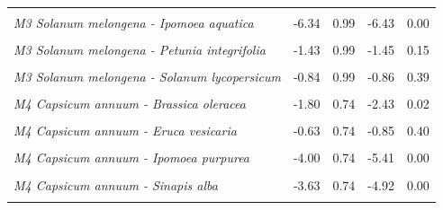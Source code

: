 \documentclass[12pt,]{article}
\begin{document}
\begin{longtable}[t]{>{}lrrrr}
\addlinespace
\em{\cellcolor{gray!6}{M3 Solanum melongena - Eruca vesicaria}} & \cellcolor{gray!6}{-3.12} & \cellcolor{gray!6}{0.99} & \cellcolor{gray!6}{-3.16} & \cellcolor{gray!6}{0.00}\\
\addlinespace
\em{M3 Solanum melongena - Ipomoea aquatica} & -6.34 & 0.99 & -6.43 & 0.00\\
\addlinespace
\em{\cellcolor{gray!6}{M3 Solanum melongena - Ipomoea purpurea}} & \cellcolor{gray!6}{-2.71} & \cellcolor{gray!6}{0.99} & \cellcolor{gray!6}{-2.74} & \cellcolor{gray!6}{0.01}\\
\addlinespace
\em{M3 Solanum melongena - Petunia integrifolia} & -1.43 & 0.99 & -1.45 & 0.15\\
\addlinespace
\em{\cellcolor{gray!6}{M3 Solanum melongena - Sinapis alba}} & \cellcolor{gray!6}{-1.11} & \cellcolor{gray!6}{0.99} & \cellcolor{gray!6}{-1.12} & \cellcolor{gray!6}{0.26}\\
\addlinespace
\em{M3 Solanum melongena - Solanum lycopersicum} & -0.84 & 0.99 & -0.86 & 0.39\\
\addlinespace
\em{\cellcolor{gray!6}{M4 Capsicum annuum - (Intercept)}} & \cellcolor{gray!6}{4.59} & \cellcolor{gray!6}{0.52} & \cellcolor{gray!6}{8.78} & \cellcolor{gray!6}{0.00}\\
\addlinespace
\em{M4 Capsicum annuum - Brassica oleracea} & -1.80 & 0.74 & -2.43 & 0.02\\
\addlinespace
\em{\cellcolor{gray!6}{M4 Capsicum annuum - Brassica rapa}} & \cellcolor{gray!6}{-2.51} & \cellcolor{gray!6}{0.74} & \cellcolor{gray!6}{-3.39} & \cellcolor{gray!6}{0.00}\\
\addlinespace
\em{M4 Capsicum annuum - Eruca vesicaria} & -0.63 & 0.74 & -0.85 & 0.40\\
\addlinespace
\em{\cellcolor{gray!6}{M4 Capsicum annuum - Ipomoea aquatica}} & \cellcolor{gray!6}{-1.36} & \cellcolor{gray!6}{0.74} & \cellcolor{gray!6}{-1.84} & \cellcolor{gray!6}{0.07}\\
\addlinespace
\em{M4 Capsicum annuum - Ipomoea purpurea} & -4.00 & 0.74 & -5.41 & 0.00\\
\addlinespace
\em{\cellcolor{gray!6}{M4 Capsicum annuum - Petunia integrifolia}} & \cellcolor{gray!6}{-4.59} & \cellcolor{gray!6}{0.74} & \cellcolor{gray!6}{-6.21} & \cellcolor{gray!6}{0.00}\\
\addlinespace
\em{M4 Capsicum annuum - Sinapis alba} & -3.63 & 0.74 & -4.92 & 0.00\\
\addlinespace
\em{\cellcolor{gray!6}{M4 Capsicum annuum - Solanum lycopersicum}} & \cellcolor{gray!6}{-1.52} & \cellcolor{gray!6}{0.74} & \cellcolor{gray!6}{-2.06} & \cellcolor{gray!6}{0.04}\\

\end{longtable}
\end{document}
